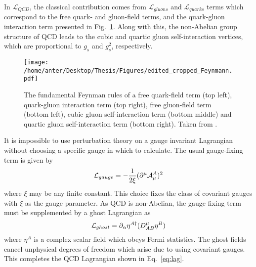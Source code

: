 In $\mathcal{L}_{QCD}$, the classical contribution comes from $\mathcal{L}_{gluons}$ and $\mathcal{L}_{quarks}$ terms which correspond to the free quark- and gluon-field terms, and the quark-gluon interaction term presented in Fig.~\ref{fig:feyn}. Along with this, the non-Abelian group structure of QCD leads to the cubic and quartic gluon self-interaction vertices, which are proportional to $g_s$ and $g^2_s$, respectively.

\begin{figure}[!h]
\begin{center}
\hspace*{-1mm}
\texttt{[image: /home/anter/Desktop/Thesis/Figures/edited\_cropped\_Feynmann.pdf]}\\
\vspace*{4mm}
\caption[The fundamental Feynman rules of QCD.]{The fundamental Feynman rules of a free quark-field term (top left), quark-gluon interaction term (top right), free gluon-field term (bottom left), cubic gluon self-interaction term (bottom middle) and quartic gluon self-interaction term (bottom right). Taken from \cite{Rabbertz:2017ssq}.}
\label{fig:feyn}
\end{center}
\end{figure}

It is impossible to use perturbation theory on a gauge invariant Lagrangian without choosing a specific gauge in which to calculate. The usual gauge-fixing term is given by 
\begin{equation}
{\cal L}_{gauge}=-\frac{1}{2\xi} (\partial^{\mu}{\cal A}^{A}_{\mu})^{2}
\label{eq:gauge-fixing}
\end{equation}
where $\xi$ may be any finite constant. This choice fixes the class of covariant gauges with $\xi$ as the gauge parameter. As QCD is non-Abelian, the gauge fixing term must be supplemented by a ghost Lagrangian as
\begin{equation}
{\cal L}_{ghost}=\partial_{\alpha}\eta^{A\dagger}(D^{\mu}_{AB}\eta^{B})
\label{eq:ghost}
\end{equation}
where $\eta^{A}$ is a complex scalar field which obeys Fermi statistics. The ghost fields cancel unphysical degrees of freedom which arise due to using covariant gauges. This completes the QCD Lagrangian shown in Eq.~\ref{eq:lag}.


